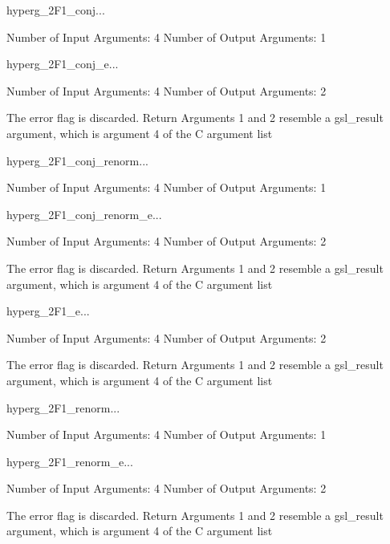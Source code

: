 \begin{funcdesc}{hyperg_2F1_conj}{...}

    Number of Input  Arguments:  4
    Number of Output Arguments:  1
\end{funcdesc}

\begin{funcdesc}{hyperg_2F1_conj_e}{...}

    Number of Input  Arguments:  4
    Number of Output Arguments:  2

The error flag is discarded.
Return Arguments 1 and 2 resemble a gsl_result argument,
	which is  argument 4 of the C argument list

\end{funcdesc}

\begin{funcdesc}{hyperg_2F1_conj_renorm}{...}

    Number of Input  Arguments:  4
    Number of Output Arguments:  1
\end{funcdesc}

\begin{funcdesc}{hyperg_2F1_conj_renorm_e}{...}

    Number of Input  Arguments:  4
    Number of Output Arguments:  2

The error flag is discarded.
Return Arguments 1 and 2 resemble a gsl_result argument,
	which is  argument 4 of the C argument list

\end{funcdesc}

\begin{funcdesc}{hyperg_2F1_e}{...}

    Number of Input  Arguments:  4
    Number of Output Arguments:  2

The error flag is discarded.
Return Arguments 1 and 2 resemble a gsl_result argument,
	which is  argument 4 of the C argument list

\end{funcdesc}

\begin{funcdesc}{hyperg_2F1_renorm}{...}

    Number of Input  Arguments:  4
    Number of Output Arguments:  1
\end{funcdesc}

\begin{funcdesc}{hyperg_2F1_renorm_e}{...}

    Number of Input  Arguments:  4
    Number of Output Arguments:  2

The error flag is discarded.
Return Arguments 1 and 2 resemble a gsl_result argument,
	which is  argument 4 of the C argument list

\end{funcdesc}

